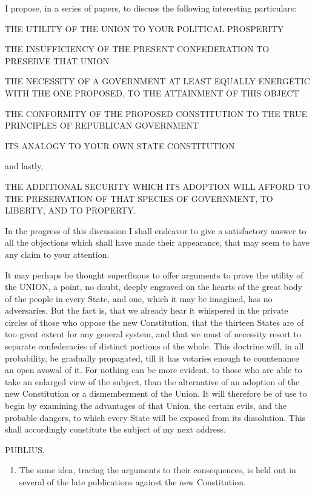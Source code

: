 I propose, in a series of papers, to discuss the following
interesting particulars:

THE UTILITY OF THE UNION TO YOUR POLITICAL PROSPERITY

THE INSUFFICIENCY OF THE PRESENT CONFEDERATION
TO PRESERVE THAT UNION  

THE NECESSITY OF A GOVERNMENT AT LEAST
EQUALLY ENERGETIC WITH THE ONE PROPOSED, TO THE ATTAINMENT OF THIS
OBJECT  

THE CONFORMITY OF THE PROPOSED CONSTITUTION TO THE TRUE
PRINCIPLES OF REPUBLICAN GOVERNMENT

ITS ANALOGY TO YOUR OWN STATE CONSTITUTION

and lastly, 

THE ADDITIONAL SECURITY WHICH ITS
ADOPTION WILL AFFORD TO THE PRESERVATION OF THAT SPECIES OF
GOVERNMENT, TO LIBERTY, AND TO PROPERTY.

In the progress of this discussion I shall endeavor to give a
satisfactory answer to all the objections which shall have made
their appearance, that may seem to have any claim to your attention.

It may perhaps be thought superfluous to offer arguments to
prove the utility of the UNION, a point, no doubt, deeply engraved
on the hearts of the great body of the people in every State, and
one, which it may be imagined, has no adversaries. But the fact is,
that we already hear it whispered in the private circles of those
who oppose the new Constitution, that the thirteen States are of too
great extent for any general system, and that we must of necessity
resort to separate confederacies of distinct portions of the
whole.\footnotemark{} This doctrine will, in all probability, be gradually
propagated, till it has votaries enough to countenance an open
avowal of it. For nothing can be more evident, to those who are
able to take an enlarged view of the subject, than the alternative
of an adoption of the new Constitution or a dismemberment of the
Union. It will therefore be of use to begin by examining the
advantages of that Union, the certain evils, and the probable
dangers, to which every State will be exposed from its dissolution.
This shall accordingly constitute the subject of my next address.


PUBLIUS.

\begin{enumerate}
  \item \label{item1.1}
The same idea, tracing the arguments to their consequences, is
held out in several of the late publications against the new
Constitution.
\end{enumerate}

